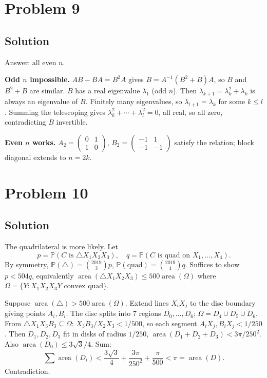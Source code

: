 \documentclass{article}
\begin{document}
\section*{Problem 9}
\subsection*{Solution}
Answer: all even $n$.

\textbf{Odd $n$ impossible.} $AB - BA = B^2 A$ gives $B = A^{-1}(B^2 + B) A$, so $B$ and $B^2 + B$ are similar. $B$ has a real eigenvalue $\lambda_1$ (odd $n$). Then $\lambda_{k+1} = \lambda_k^2 + \lambda_k$ is always an eigenvalue of $B$. Finitely many eigenvalues, so $\lambda_{l+1} = \lambda_k$ for some $k \leq l$. Summing the telescoping gives $\lambda_k^2 + \cdots + \lambda_l^2 = 0$, all real, so all zero, contradicting $B$ invertible.

\textbf{Even $n$ works.} $A_2 = \begin{pmatrix} 0 & 1 \\ 1 & 0 \end{pmatrix}$, $B_2 = \begin{pmatrix} -1 & 1 \\ -1 & -1 \end{pmatrix}$ satisfy the relation; block diagonal extends to $n = 2k$.

\section*{Problem 10}
\subsection*{Solution}
The quadrilateral is more likely. Let
\[ p = \mathbb{P}(C \text{ is } \triangle X_1 X_2 X_3), \quad q = \mathbb{P}(C \text{ is quad on } X_1,\ldots,X_4). \]
By symmetry, $\mathbb{P}(\triangle) = \binom{2019}{3} p$, $\mathbb{P}(\text{quad}) = \binom{2019}{4} q$. Suffices to show $p < 504 q$, equivalently $\operatorname{area}(\triangle X_1 X_2 X_3) \leq 500 \operatorname{area}(\Omega)$ where $\Omega = \{Y : X_1 X_2 X_3 Y \text{ convex quad}\}$.

Suppose $\operatorname{area}(\triangle) > 500 \operatorname{area}(\Omega)$. Extend lines $X_i X_j$ to the disc boundary giving points $A_i, B_i$. The disc splits into 7 regions $D_0, \ldots, D_6$; $\Omega = D_4 \cup D_5 \cup D_6$. From $\triangle X_1 X_3 B_3 \subseteq \Omega$: $X_3 B_3 / X_2 X_3 < 1/500$, so each segment $A_i X_j, B_i X_j < 1/250$. Then $D_1, D_2, D_3$ fit in disks of radius $1/250$, $\operatorname{area}(D_1 + D_2 + D_3) < 3\pi/250^2$. Also $\operatorname{area}(D_0) \leq 3\sqrt 3/4$. Sum:
\[ \sum \operatorname{area}(D_i) < \frac{3\sqrt 3}{4} + \frac{3\pi}{250^2} + \frac{\pi}{500} < \pi = \operatorname{area}(D). \]
Contradiction.
\end{document}
